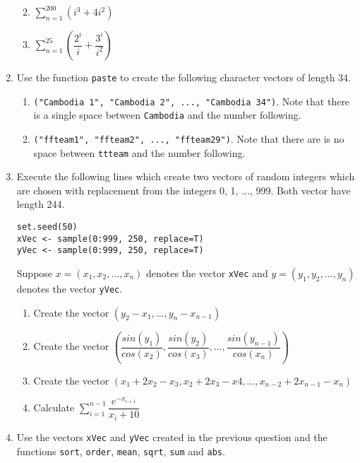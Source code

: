 \documentclass[11pt,a4paper]{article}
\begin{document}
\begin{enumerate}
	\begin{multicols}{2}
		\begin{enumerate}
			\everymath{\displaystyle}  
			\item $\sum_{n=1}^{200}(i^{3}+4i^{2})$
			\item $\sum_{n=1}^{25}(\dfrac{2^{i}}{i} + \dfrac{3^{i}}{i^{2}})$ 
		\end{enumerate}
	\end{multicols}
	
	\item Use the function \texttt{paste} to create the following character vectors of length 34. 
	\begin{enumerate}
		\item \texttt{("Cambodia 1", "Cambodia 2", ..., "Cambodia 34")}. Note that there is a single space between \texttt{Cambodia} and the number following. 
		\item \texttt{("ffteam1", "ffteam2", ..., "ffteam29")}. Note that there are is no space between \texttt{ttteam} and the number following.  
	\end{enumerate}

	\item Execute the following lines which create two vectors of random integers which are chosen with replacement from the integers 0, 1, ..., 999. Both vector have length 244. 
	
	\texttt{set.seed(50) \\
	xVec <- sample(0:999, 250, replace=T)\\
	yVec <- sample(0:999, 250, replace=T)}

	Suppose $x = (x_{1}, x_{2}, ..., x_{n})$ denotes the vector \texttt{xVec} and $y = (y_{1}, y_{2}, ..., y_{n})$ denotes the vector \texttt{yVec}.
	
	\begin{enumerate}
		\item Create the vector $(y_{2}-x_{1}, ..., y_{n}-x_{n-1})$
		\item Create the vector $\left ( \dfrac{sin(y_{1})}{cos(x_{2})}, \dfrac{sin(y_{2})}{cos(x_{3})}, ..., \dfrac{sin(y_{n-1})}{cos(x_{n})}\right )$
		\item Create the vector $(x_{1} + 2x_{2} - x_{3}, x_{2} + 2x_{3} - x{4}, ..., x_{n-2} +2x_{n-1} - x_{n})$
		\everymath{\displaystyle}  
		\item Calculate $\sum_{i=1}^{n-1} \dfrac{e^{-x_{i+1}}}{x_{i} + 10}$
	\end{enumerate}

	\item Use the vectors \texttt{xVec} and \texttt{yVec} created in the previous question and the functions \texttt{sort}, \texttt{order}, \texttt{mean}, \texttt{sqrt}, \texttt{sum} and \texttt{abs}. 
	

\end{enumerate}
\end{document}
